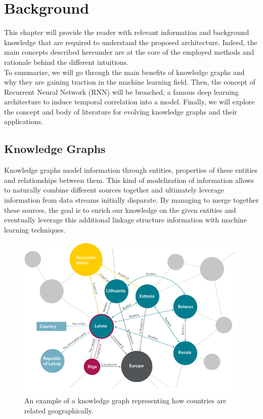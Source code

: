 \chapter{Background}
\label{chap:Background}
This chapter will provide the reader with relevant information and background knowledge that are required to understand the proposed architecture. Indeed, the main concepts described hereunder are at the core of the employed methods and rationale behind the different intuitions. \\

To summarize, we will go through the main benefits of knowledge graphs and why they are gaining traction in the machine learning field. Then, the concept of Recurrent Neural Network (RNN) will be broached, a famous deep learning architecture to induce temporal correlation into a model. Finally, we will explore the concept and body of literature for evolving knowledge graphs and their applications.

\section{Knowledge Graphs}
\label{sec:Knowledge Graph}
Knowledge graphs model information through entities, properties of these entities and relationships between them. This kind of modelization of information allows to naturally combine different sources together and ultimately leverage information from data streams initially disparate. By managing to merge together these sources, the goal is to enrich our knowledge on the given entities and eventually leverage this additional linkage structure information with machine learning techniques. \\

\begin{figure}
 \centering
 \includegraphics[width=.9\linewidth]{figures/kg-example.png}
 \captionsetup{width=.9\linewidth}
 \caption{An example of a knowledge graph representing how countries are related geographically.}
 \label{fig:kg-example}
\end{figure}

